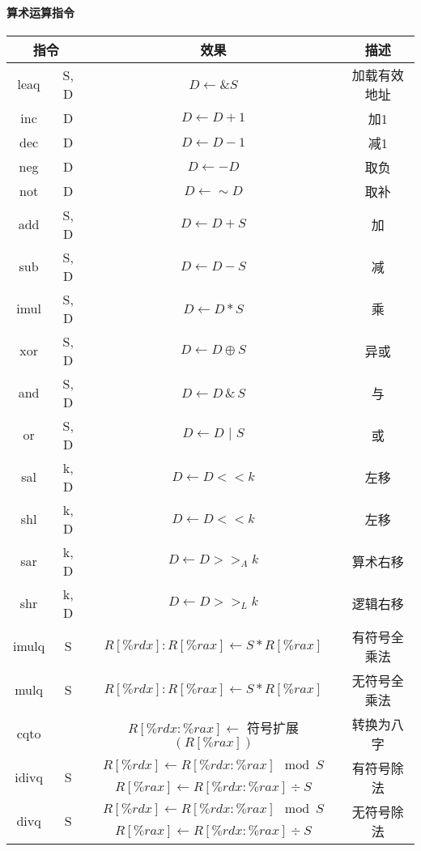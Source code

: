 \paragraph{算术运算指令}
\begin{table}[H]
    \centering
    \begin{tabular}{|c c|c|c|}
        \hline
        \multicolumn{2}{|c|}{\textbf{指令}} & \textbf{效果} & \textbf{描述} \\
        \hline
        leaq & S, D & $D \leftarrow \&S$ & 加载有效地址 \\
        \hline
        inc & D & $D \leftarrow D + 1$ & 加1 \\
        dec & D & $D \leftarrow D - 1$ & 减1 \\
        neg & D & $D \leftarrow -D$ & 取负 \\
        not & D & $D \leftarrow \sim D$ & 取补 \\
        \hline
        add & S, D & $D \leftarrow D + S$ & 加 \\
        sub & S, D & $D \leftarrow D - S$ & 减 \\
        imul & S, D & $D \leftarrow D * S$ & 乘 \\
        xor & S, D & $D \leftarrow D \oplus S$ & 异或 \\
        and & S, D & $D \leftarrow D \,\&\, S$ & 与 \\
        or  & S, D & $D \leftarrow D \,\,|\,\, S$ & 或\\
        \hline
        sal & k, D & $D \leftarrow D << k$ & 左移 \\
        shl & k, D & $D \leftarrow D << k$ & 左移 \\
        sar & k, D & $D \leftarrow D >>_A k$ & 算术右移 \\
        shr & k, D & $D \leftarrow D >>_L k$ & 逻辑右移 \\
        \hline
        imulq & S & $R[\%rdx]:R[\%rax] \leftarrow S * R[\%rax]$ & 有符号全乘法 \\
        mulq & S & $R[\%rdx]:R[\%rax] \leftarrow S * R[\%rax]$ & 无符号全乘法 \\
        \hline
        cqto & & $R[\%rdx:\%rax] \leftarrow$ 符号扩展$(R[\%rax])$ & 转换为八字 \\
        \hline
        \multirow{2}{*}{idivq} &  \multirow{2}{*}{S} & $R[\%rdx] \leftarrow R[\%rdx:\%rax] \mod S$ &  \multirow{2}{*}{有符号除法} \\
        & & $R[\%rax] \leftarrow R[\%rdx:\%rax] \div S$ & \\
        \hline
        \multirow{2}{*}{divq} &  \multirow{2}{*}{S} & $R[\%rdx] \leftarrow R[\%rdx:\%rax] \mod S$ &  \multirow{2}{*}{无符号除法} \\
        & & $R[\%rax] \leftarrow R[\%rdx:\%rax] \div S$ & \\
        \hline
    \end{tabular}
\end{table}

